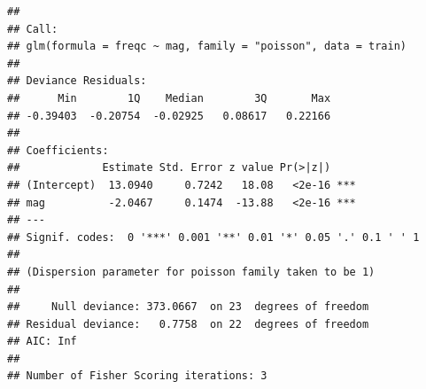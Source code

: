 \documentclass[
]{article}
\begin{document}
\begin{verbatim}
## 
## Call:
## glm(formula = freqc ~ mag, family = "poisson", data = train)
## 
## Deviance Residuals: 
##      Min        1Q    Median        3Q       Max  
## -0.39403  -0.20754  -0.02925   0.08617   0.22166  
## 
## Coefficients:
##             Estimate Std. Error z value Pr(>|z|)    
## (Intercept)  13.0940     0.7242   18.08   <2e-16 ***
## mag          -2.0467     0.1474  -13.88   <2e-16 ***
## ---
## Signif. codes:  0 '***' 0.001 '**' 0.01 '*' 0.05 '.' 0.1 ' ' 1
## 
## (Dispersion parameter for poisson family taken to be 1)
## 
##     Null deviance: 373.0667  on 23  degrees of freedom
## Residual deviance:   0.7758  on 22  degrees of freedom
## AIC: Inf
## 
## Number of Fisher Scoring iterations: 3
\end{verbatim}
\end{document}
